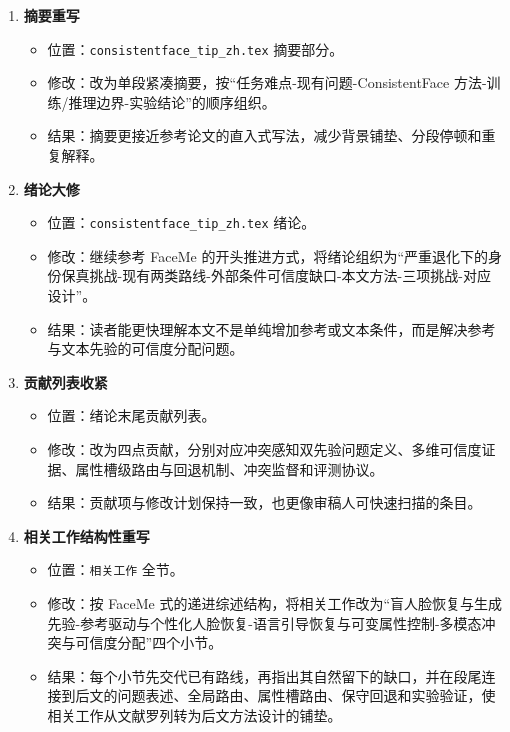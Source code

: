 \documentclass[UTF8,a4paper,zihao=-4]{ctexart}
\begin{document}
\begin{enumerate}
  \item \textbf{摘要重写}
  \begin{itemize}
    \item 位置：\texttt{consistentface\_tip\_zh.tex} 摘要部分。
    \item 修改：改为单段紧凑摘要，按“任务难点-现有问题-ConsistentFace 方法-训练/推理边界-实验结论”的顺序组织。
    \item 结果：摘要更接近参考论文的直入式写法，减少背景铺垫、分段停顿和重复解释。
  \end{itemize}

  \item \textbf{绪论大修}
  \begin{itemize}
    \item 位置：\texttt{consistentface\_tip\_zh.tex} 绪论。
    \item 修改：继续参考 FaceMe 的开头推进方式，将绪论组织为“严重退化下的身份保真挑战-现有两类路线-外部条件可信度缺口-本文方法-三项挑战-对应设计”。
    \item 结果：读者能更快理解本文不是单纯增加参考或文本条件，而是解决参考与文本先验的可信度分配问题。
  \end{itemize}

  \item \textbf{贡献列表收紧}
  \begin{itemize}
    \item 位置：绪论末尾贡献列表。
    \item 修改：改为四点贡献，分别对应冲突感知双先验问题定义、多维可信度证据、属性槽级路由与回退机制、冲突监督和评测协议。
    \item 结果：贡献项与修改计划保持一致，也更像审稿人可快速扫描的条目。
  \end{itemize}

  \item \textbf{相关工作结构性重写}
  \begin{itemize}
    \item 位置：\texttt{相关工作} 全节。
    \item 修改：按 FaceMe 式的递进综述结构，将相关工作改为“盲人脸恢复与生成先验-参考驱动与个性化人脸恢复-语言引导恢复与可变属性控制-多模态冲突与可信度分配”四个小节。
    \item 结果：每个小节先交代已有路线，再指出其自然留下的缺口，并在段尾连接到后文的问题表述、全局路由、属性槽路由、保守回退和实验验证，使相关工作从文献罗列转为后文方法设计的铺垫。
  \end{itemize}


\end{enumerate}
\end{document}
